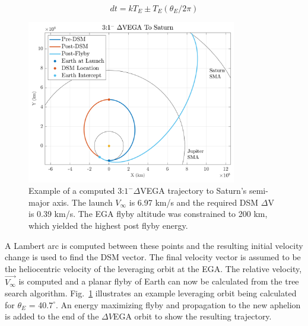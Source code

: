 \documentclass[letterpaper, preprint, paper,11pt]{AAS}	%
\begin{document}
\begin{equation}
	\label{eq:dteqn}
	dt = kT_E \pm T_E(\theta_E/2\pi)
\end{equation}


\begin{figure}[htb]
	\centering\includegraphics[width=3.6in]{./fig/dsmmatlab}
	\caption{Example of a computed 3:$1^{-} \Delta$VEGA trajectory to Saturn's semi-major axis. The launch $V_\infty$ is 6.97 km/s and the required DSM $\Delta$V is 0.39 km/s. The EGA flyby altitude was constrained to 200 km, which yielded the highest post flyby energy.}
	\label{fig:dsmmatlab}
\end{figure}

A Lambert arc is computed between these points and the resulting initial velocity change is used to find the DSM vector. The final velocity vector is assumed to be the heliocentric velocity of the leveraging orbit at the EGA. The relative velocity, $\vec{V_\infty}$ is computed and a planar flyby of Earth can now be calculated from the tree search algorithm. Fig.~\ref{fig:dsmmatlab} illustrates an example leveraging orbit being calculated for $\theta_{E}$ = 40.$7^{\circ}$. An energy maximizing flyby and propagation to the new aphelion is added to the end of the $\Delta V$EGA orbit to show the resulting trajectory.
\end{document}
